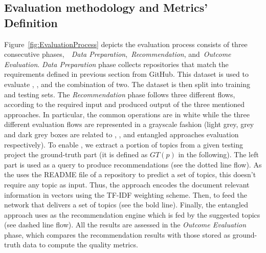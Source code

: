 

\subsection{Evaluation methodology and Metrics’ Definition}\label{sec:methodology-metric}

Figure~\ref{fig:EvaluationProcess} depicts the evaluation process consists of three consecutive phases,~\ie~\emph{Data Preparation},~\emph{Recommendation}, and~\emph{Outcome Evaluation}. \emph{Data Preparation} phase collects repositories that match the requirements defined in previous section from GitHub. This dataset is used to evaluate \CT, \MNB, and the combination of two. 
The dataset is then split into training and testing sets. The 
\emph{Recommendation} phase follows three different flows, according to the required input and produced output of the three mentioned approaches. In particular, the common operations are in white while the three different evaluation flows are represented in a grayscale fashion (\ie light grey, grey and dark grey boxes are related to \CT, \MNB, and entangled approaches evaluation respectively).
To enable \CT, we extract a portion of topics from a given testing project \ie the ground-truth part (it is defined as $GT(p)$ in the following). The left part is used as a query to produce recommendations (see the dotted line flow). As the \MNB uses the README file of a repository to predict a set of topics, this doesn't require any topic as input. Thus, the approach encodes the document relevant information in vectors using the TF-IDF weighting scheme. Then, to feed the network that delivers a set of topics (see the bold line). Finally, the entangled approach uses \CT as the recommendation engine which is fed by the \MNB suggested topics (see dashed line flow). All the results are assessed in the \emph{Outcome Evaluation} phase, which compares the recommendation results with those stored as ground-truth data to compute the quality metrics. 


